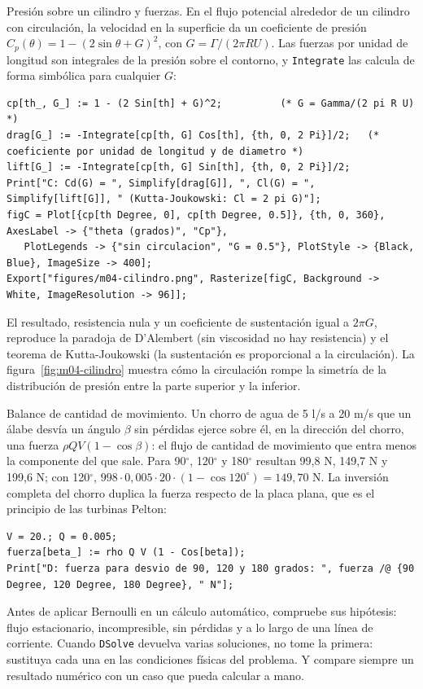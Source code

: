 \documentclass[10pt,openany]{book}
\begin{document}
Presión sobre un cilindro y fuerzas. En el flujo potencial alrededor de un cilindro con circulación, la velocidad en la superficie da un coeficiente de presión \(C_p(\theta) = 1 - (2\sin\theta + G)^{2}\), con \(G = \Gamma/(2\pi R U)\). Las fuerzas por unidad de longitud son integrales de la presión sobre el contorno, y \texttt{Integrate} las calcula de forma simbólica para cualquier \(G\):
\begin{lstlisting}[style=studium]
cp[th_, G_] := 1 - (2 Sin[th] + G)^2;          (* G = Gamma/(2 pi R U) *)
drag[G_] := -Integrate[cp[th, G] Cos[th], {th, 0, 2 Pi}]/2;   (* coeficiente por unidad de longitud y de diametro *)
lift[G_] := -Integrate[cp[th, G] Sin[th], {th, 0, 2 Pi}]/2;
Print["C: Cd(G) = ", Simplify[drag[G]], ", Cl(G) = ", Simplify[lift[G]], " (Kutta-Joukowski: Cl = 2 pi G)"];
figC = Plot[{cp[th Degree, 0], cp[th Degree, 0.5]}, {th, 0, 360}, AxesLabel -> {"theta (grados)", "Cp"},
   PlotLegends -> {"sin circulacion", "G = 0.5"}, PlotStyle -> {Black, Blue}, ImageSize -> 400];
Export["figures/m04-cilindro.png", Rasterize[figC, Background -> White, ImageResolution -> 96]];
\end{lstlisting}
El resultado, resistencia nula y un coeficiente de sustentación igual a \(2\pi G\), reproduce la paradoja de D'Alembert (sin viscosidad no hay resistencia) y el teorema de Kutta-Joukowski (la sustentación es proporcional a la circulación). La figura~\ref{fig:m04-cilindro} muestra cómo la circulación rompe la simetría de la distribución de presión entre la parte superior y la inferior.

Balance de cantidad de movimiento. Un chorro de agua de 5 l/s a 20 m/s que un álabe desvía un ángulo \(\beta\) sin pérdidas ejerce sobre él, en la dirección del chorro, una fuerza \(\rho Q V(1 - \cos\beta)\): el flujo de cantidad de movimiento que entra menos la componente del que sale. Para 90\(^\circ\), 120\(^\circ\) y 180\(^\circ\) resultan 99,8 N, 149,7 N y 199,6 N; con 120\(^\circ\), \(998\cdot 0{,}005\cdot 20\cdot(1 - \cos 120^\circ) = 149{,}70\) N. La inversión completa del chorro duplica la fuerza respecto de la placa plana, que es el principio de las turbinas Pelton:
\begin{lstlisting}[style=studium]
V = 20.; Q = 0.005;
fuerza[beta_] := rho Q V (1 - Cos[beta]);
Print["D: fuerza para desvio de 90, 120 y 180 grados: ", fuerza /@ {90 Degree, 120 Degree, 180 Degree}, " N"];
\end{lstlisting}

\begin{tcolorbox}[title={Consejo}, studiumtip, breakable]

Antes de aplicar Bernoulli en un cálculo automático, compruebe sus hipótesis: flujo estacionario, incompresible, sin pérdidas y a lo largo de una línea de corriente. Cuando \texttt{DSolve} devuelva varias soluciones, no tome la primera: sustituya cada una en las condiciones físicas del problema. Y compare siempre un resultado numérico con un caso que pueda calcular a mano.
\end{tcolorbox}
\end{document}
